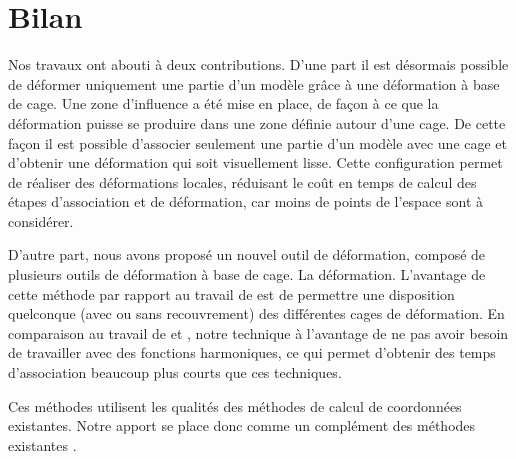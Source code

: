 
\def\baselinestretch{1}
\chapter{Bilan}
\ifpdf
\graphicspath{{Conclusions/ConclusionsFigs/PNG/}{Conclusions/ConclusionsFigs/PDF/}{Conclusions/ConclusionsFigs/}}
\else
\graphicspath{{Conclusions/ConclusionsFigs/EPS/}{Conclusions/ConclusionsFigs/}}
\fi

Nos travaux ont abouti à deux contributions. D'une part il est désormais
possible de déformer uniquement une partie d'un modèle grâce à une déformation
à base de cage. Une zone d'influence a été mise en place, de façon à ce que la
déformation puisse se produire dans une zone définie autour d'une cage. De
cette façon il est possible d'associer seulement une partie d'un modèle avec
une cage et d'obtenir une déformation qui soit visuellement lisse. Cette
configuration permet de réaliser des déformations locales, réduisant le coût
en temps de calcul des étapes d'association et de déformation, car moins de
points de l'espace sont à considérer.

D'autre part, nous avons proposé un nouvel outil de déformation, composé de
plusieurs outils de déformation à base de cage. La déformation. L'avantage de
cette méthode par rapport au travail de \cite{GPCP13} est de permettre une
disposition quelconque (avec ou sans recouvrement) des différentes cages de
déformation. En comparaison au travail de \cite{JBPS11} et \cite{GPCP13},
notre technique à l'avantage de ne pas avoir besoin de travailler avec des
fonctions harmoniques, ce qui permet d'obtenir des temps d'association
beaucoup plus courts que ces techniques.

Ces méthodes utilisent les qualités des méthodes de calcul de coordonnées
existantes. Notre apport se place donc comme un complément des méthodes
existantes
.



